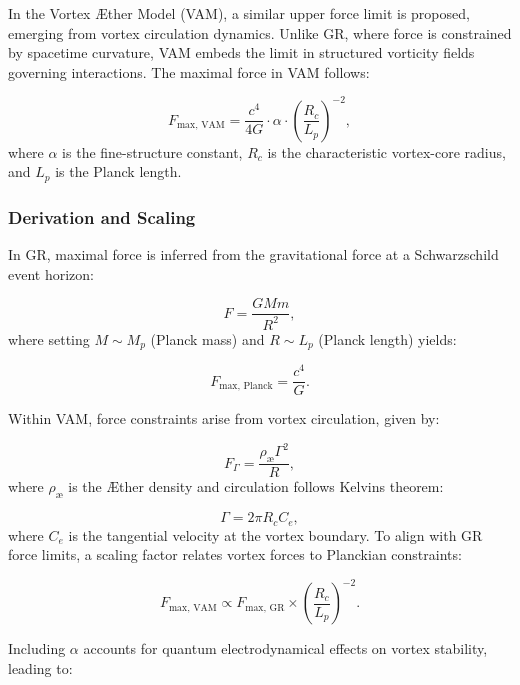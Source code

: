 In the Vortex Æther Model (VAM), a similar upper force limit is proposed, emerging from vortex circulation dynamics. Unlike GR, where force is constrained by spacetime curvature, VAM embeds the limit in structured vorticity fields governing interactions. The maximal force in VAM follows:


\begin{equation*}
    F_\text{max, VAM} = \frac{c^4}{4G} \cdot \alpha \cdot \left(\frac{R_c}{L_p}\right)^{-2},
\end{equation*}
where $\alpha$ is the fine-structure constant, $R_c$ is the characteristic vortex-core radius, and $L_p$ is the Planck length.


\subsubsection*{Derivation and Scaling}
In GR, maximal force is inferred from the gravitational force at a Schwarzschild event horizon:


\begin{equation*}
    F = \frac{GMm}{R^2},
\end{equation*}
where setting $M \sim M_p$ (Planck mass) and $R \sim L_p$ (Planck length) yields:


\begin{equation*}
    F_\text{max, Planck} = \frac{c^4}{G}.
\end{equation*}


Within VAM, force constraints arise from vortex circulation, given by:


\begin{equation*}
    F_{\Gamma} = \frac{\rho_\text{\ae} \Gamma^2}{R},
\end{equation*}
where $\rho_\text{\ae}$ is the Æther density and circulation follows Kelvin\rqs s theorem:


\begin{equation*}
    \Gamma = 2\pi R_c C_e,
\end{equation*}
where $C_e$ is the tangential velocity at the vortex boundary. To align with GR force limits, a scaling factor relates vortex forces to Planckian constraints:


\begin{equation*}
    F_\text{max, VAM} \propto F_\text{max, GR} \times \left(\frac{R_c}{L_p}\right)^{-2}.
\end{equation*}


Including $\alpha$ accounts for quantum electrodynamical effects on vortex stability, leading to:


